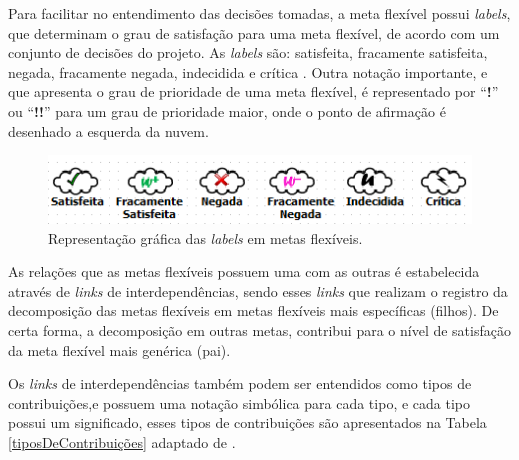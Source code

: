 Para facilitar no entendimento das decisões tomadas, a meta flexível possui \textit{labels}, que determinam o grau de satisfação para uma meta flexível, de acordo com um conjunto de decisões do projeto. As \textit{labels} são: satisfeita, fracamente satisfeita,  negada, fracamente negada, indecidida e crítica \cite{chung2012non}. Outra notação importante, e que apresenta o grau de prioridade de uma meta flexível, é representado por “\textbf{!}” ou “\textbf{!!}” para um grau de prioridade maior, onde o ponto de afirmação é desenhado a esquerda da nuvem.

\begin{figure}[h]
	\centering
	\includegraphics[keepaspectratio=true,scale=0.9]{figuras/labelsSoftgoals.png}
	\caption{Representação gráfica das \textit{labels} em metas flexíveis.}
	\label{fig02}
\end{figure} 

As relações que as metas flexíveis possuem uma com as outras é estabelecida através de \textit{links} de interdependências, sendo esses \textit{links} que realizam o registro da decomposição das metas flexíveis em metas flexíveis mais específicas (filhos). De certa forma, a decomposição em outras metas, contribui para o nível de satisfação da meta flexível mais genérica (pai).

Os \textit{links} de interdependências também podem ser entendidos como tipos de contribuições,e possuem uma notação simbólica para cada tipo, e cada tipo possui um significado, esses tipos de contribuições são apresentados na Tabela \ref{tiposDeContribuições} adaptado de  \cite{chung2012non}.




